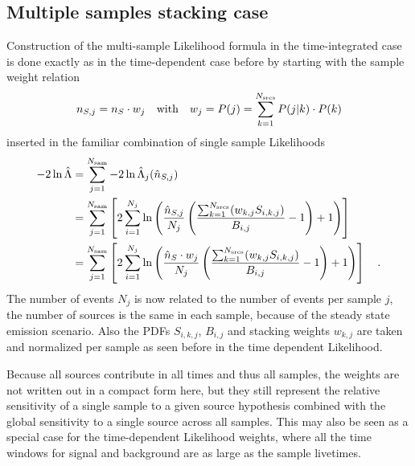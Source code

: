 \subsection{Multiple samples stacking case}
Construction of the multi-sample Likelihood formula in the time-integrated case is done exactly as in the time-dependent case before by starting with the sample weight relation
\begin{equation}
  n_{S,j} = n_S \cdot w_j
  \quad\text{with}\quad
  w_j = P(j) = \sum_{k=1}^{N_\text{srcs}} P(j|k)\cdot P(k)
\end{equation}
inserted in the familiar combination of single sample Likelihoods
\begin{align}
  -2\ln\hat{\Lambda}
  &= \sum_{j=1}^{N_\text{sam}} -2\ln\hat{\Lambda}_j(\hat{n}_{S,j}) \\
  &= \sum_{j=1}^{N_\text{sam}} \left[
      2\sum_{i=1}^{N_j} \ln\left(
        \frac{\hat{n}_{S,j}}{N_j}\left(
          \frac{\sum_{k=1}^{N_\text{srcs}}(w_{k,j} S_{i,k,j})}{B_{i,j}} - 1
        \right) + 1
      \right)
    \right] \\
  &= \sum_{j=1}^{N_\text{sam}} \left[
      2\sum_{i=1}^{N_j} \ln\left(
        \frac{\hat{n}_S \cdot w_j}{N_j}\left(
          \frac{\sum_{k=1}^{N_\text{srcs}}(w_{k,j} S_{i,k,j})}{B_{i,j}} - 1
        \right) + 1
      \right)
    \right]
  \quad\text{.}
\end{align}
The number of events $N_j$ is now related to the number of events per sample $j$, the number of sources is the same in each sample, because of the steady state emission scenario.
Also the PDFs $S_{i,k,j}$, $B_{i,j}$ and stacking weights $w_{k,j}$ are taken and normalized per sample as seen before in the time dependent Likelihood.

Because all sources contribute in all times and thus all samples, the weights are not written out in a compact form here, but they still represent the relative sensitivity of a single sample to a given source hypothesis combined with the global sensitivity to a single source across all samples.
This may also be seen as a special case for the time-dependent Likelihood weights, where all the time windows for signal and background are as large as the sample livetimes.

